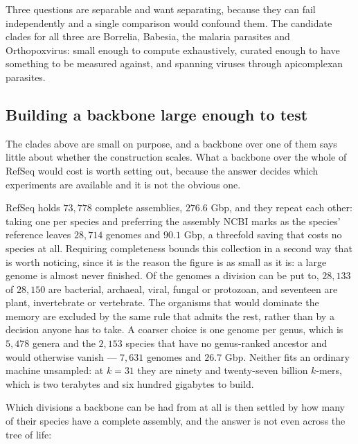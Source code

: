 \documentclass[pdflatex,sn-vancouver-num]{sn-jnl}
\begin{document}
 

Three questions are separable and want separating, because they can fail independently and a single
comparison would confound them. The candidate clades for all three are Borrelia, Babesia, the
malaria parasites and Orthopoxvirus: small enough to compute exhaustively, curated enough to have
something to be measured against, and spanning viruses through apicomplexan parasites.

    \subsection{Building a backbone large enough to test}\label{backbonebuild}

The clades above are small on purpose, and a backbone over one of them says little about whether the
construction scales. What a backbone over the whole of RefSeq would cost is worth setting out, because
the answer decides which experiments are available and it is not the obvious one.

RefSeq holds $73{,}778$ complete assemblies, $276.6$ Gbp, and they repeat each other: taking one per
species and preferring the assembly NCBI marks as the species' reference leaves $28{,}714$ genomes and
$90.1$ Gbp, a threefold saving that costs no species at all. Requiring completeness bounds this
collection in a second way that is worth noticing, since it is the reason the figure is as small as it
is: a large genome is almost never finished. Of the genomes a division can be put to, $28{,}133$ of
$28{,}150$ are bacterial, archaeal, viral, fungal or protozoan, and seventeen are plant, invertebrate
or vertebrate. The organisms that would dominate the memory are excluded by the same rule that admits
the rest, rather than by a decision anyone has to take. A coarser choice is one genome per genus,
which is $5{,}478$ genera and the $2{,}153$ species that have no genus-ranked ancestor and would
otherwise vanish --- $7{,}631$ genomes and $26.7$ Gbp. Neither fits an ordinary machine unsampled: at
$k = 31$ they are ninety and twenty-seven billion $k$-mers, which is two terabytes and six hundred
gigabytes to build.

Which divisions a backbone can be had from at all is then settled by how many of their species have a
complete assembly, and the answer is not even across the tree of life:
\end{document}
